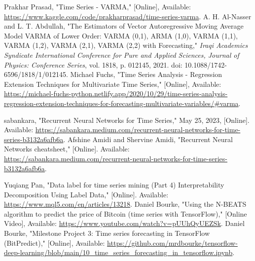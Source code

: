 \begin{thebibliography}{00}
     Prakhar Prasad, "Time Series - VARMA," [Online], Available: \href{https://www.kaggle.com/code/prakharprasad/time-series-varma}{https://www.kaggle.com/code/prakharprasad/time-series-varma}.
     A. H. Al-Nasser and L. T. Abdullah, "The Estimators of Vector Autoregressive Moving Average Model VARMA of Lower Order: VARMA (0,1), ARMA (1,0), VARMA (1,1), VARMA (1,2), VARMA (2,1), VARMA (2,2) with Forecasting," \textit{Iraqi Academics Syndicate International Conference for Pure and Applied Sciences, Journal of Physics: Conference Series}, vol. 1818, p. 012145, 2021. doi: 10.1088/1742-6596/1818/1/012145.
     Michael Fuchs, "Time Series Analysis - Regression Extension Techniques for Multivariate Time Series," [Online], Available: \href{https://michael-fuchs-python.netlify.app/2020/10/29/time-series-analysis-regression-extension-techniques-for-forecasting-multivariate-variables/#varma}{https://michael-fuchs-python.netlify.app/2020/10/29/time-series-analysis-regression-extension-techniques-for-forecasting-multivariate-variables/\#varma}.

     sabankara, "Recurrent Neural Networks for Time Series," May 25, 2023, [Online]. Available: \href{https://sabankara.medium.com/recurrent-neural-networks-for-time-series-b3132a6afb6a}{https://sabankara.medium.com/recurrent-neural-networks-for-time-series-b3132a6afb6a}.
     Afshine Amidi and Shervine Amidi, "Recurrent Neural Networks cheatsheet," [Online]. Available: \href{https://sabankara.medium.com/recurrent-neural-networks-for-time-series-b3132a6afb6a}{https://sabankara.medium.com/recurrent-neural-networks-for-time-series-b3132a6afb6a}.

     Yuqiang Pan, "Data label for time series mining (Part 4) Interpretability Decomposition Using Label Data," [Online]. Available: \href{https://www.mql5.com/en/articles/13218}{https://www.mql5.com/en/articles/13218}.
     Daniel Bourke, "Using the N-BEATS algorithm to predict the price of Bitcoin (time series with TensorFlow)," [Online Video], Available: \href{https://www.youtube.com/watch?v=pUUhQyUEZSk}{https://www.youtube.com/watch?v=pUUhQyUEZSk}.
     Daniel Bourke, "Milestone Project 3: Time series forecasting in TensorFlow (BitPredict)," [Online], Available: \href{https://github.com/mrdbourke/tensorflow-deep-learning/blob/main/10_time_series_forecasting_in_tensorflow.ipynb}{https://github.com/mrdbourke/tensorflow-deep-learning/blob/main/10\_time\_series\_forecasting\_in\_tensorflow.ipynb}.


\end{thebibliography}
